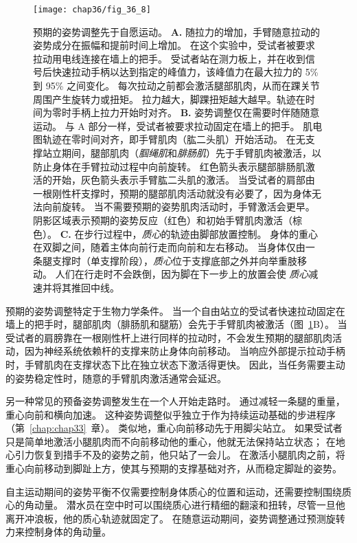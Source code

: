\begin{figure}[htbp]
	\centering
	\texttt{[image: chap36/fig\_36\_8]}
	\caption{预期的姿势调整先于自愿运动。
		\textbf{A.} 随拉力的增加，手臂随意拉动的姿势成分在振幅和提前时间上增加。
		在这个实验中，受试者被要求拉动用电线连接在墙上的把手。
		受试者站在测力板上，并在收到信号后快速拉动手柄以达到指定的峰值力，该峰值力在最大拉力的 5\% 到 95\% 之间变化。
		每次拉动之前都会激活腿部肌肉，从而在踝关节周围产生旋转力或扭矩。
		拉力越大，脚踝扭矩越大越早。轨迹在时间为零时手柄上拉力开始时对齐\cite{lee1990organization}。
		\textbf{B.} 姿势调整仅在需要时伴随随意运动。
		与 A 部分一样，受试者被要求拉动固定在墙上的把手。
		肌电图轨迹在零时间对齐，即手臂肌肉（肱二头肌）开始活动。
		在无支撑站立期间，腿部肌肉（\textit{腘绳肌}和\textit{腓肠肌}）先于手臂肌肉被激活，以防止身体在手臂拉动过程中向前旋转。
		红色箭头表示腿部腓肠肌激活的开始，灰色箭头表示手臂肱二头肌的激活。
		当受试者的肩部由一根刚性杆支撑时，预期的腿部肌肉活动就没有必要了，因为身体无法向前旋转。
		当不需要预期的姿势肌肉活动时，手臂激活会更早。阴影区域表示预期的姿势反应（红色）和初始手臂肌肉激活（棕色）\cite{cordo1982properties}。
		\textbf{C.} 在步行过程中，\textit{质心}的轨迹由脚部放置控制。
		身体的重心在双脚之间，随着主体向前行走而向前和左右移动。
		当身体仅由一条腿支撑时（单支撑阶段），\textit{质心}位于支撑底部之外并向举重肢移动。
		人们在行走时不会跌倒，因为脚在下一步上的放置会使 \textit{质心}减速并将其推回中线\cite{mackinnon1993control}。}
	\label{fig:36_8}
\end{figure}


预期的姿势调整特定于生物力学条件。
当一个自由站立的受试者快速拉动固定在墙上的把手时，腿部肌肉（腓肠肌和腿筋）会先于手臂肌肉被激活（图~\ref{fig:36_8}B）。
当受试者的肩膀靠在一根刚性杆上进行同样的拉动时，不会发生预期的腿部肌肉活动，因为神经系统依赖杆的支撑来防止身体向前移动。
当响应外部提示拉动手柄时，手臂肌肉在支撑状态下比在独立状态下激活得更快。
因此，当任务需要主动的姿势稳定性时，随意的手臂肌肉激活通常会延迟。


另一种常见的预备姿势调整发生在一个人开始走路时。
通过减轻一条腿的重量，重心向前和横向加速。
这种姿势调整似乎独立于作为持续运动基础的步进程序（第~\ref{chap:chap33}~章）。
类似地，重心向前移动先于用脚尖站立。
如果受试者只是简单地激活小腿肌肉而不向前移动他的重心，他就无法保持站立状态；
在地心引力恢复到措手不及的姿势之前，他只站了一会儿。
在激活小腿肌肉之前，将重心向前移动到脚趾上方，使其与预期的支撑基础对齐，从而稳定脚趾的姿势。


自主运动期间的姿势平衡不仅需要控制身体质心的位置和运动，还需要控制围绕质心的角动量。
潜水员在空中时可以围绕质心进行精细的翻滚和扭转，尽管一旦他离开冲浪板，他的质心轨迹就固定了。
在随意运动期间，姿势调整通过预测旋转力来控制身体的角动量。



